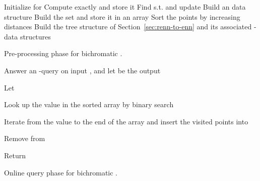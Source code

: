 \begin{algorithm}[!htb]
\LinesNumbered


  \BlankLine

  Initialize  for \;
  \ForEach{} {
    Compute  exactly and store it\;
    Find  s.t.  and
    update \;
  }
  \ForEach{} {
    Build an  data structure\;
  }
  \ForEach{} {
    Build the set  and store it 
    in an array  \;
    Sort the points  by increasing distances \;
  }
  Build the tree structure  of
  Section~\ref{sec:renn-to-enn} and its associated -\pleb data
  structures  \;
\caption{\small Pre-processing phase for bichromatic \rnn.}
  \label{alg:rnnpre_bichro}
\end{algorithm}
\begin{algorithm}[!htb]
\LinesNumbered


  \BlankLine

Answer an -\nn query on input , and let   be the output \;
  \For{ } { 
  }

  Let \; 

  Look up the value  in the sorted array  by binary search \;

  Iterate from the value  to the end of the array  and insert the visited points into  \;


  \ForEach{ } {
    \If{} {
        Remove  from \;
    }
  } 

  Return  \;
\caption{\small Online query phase for bichromatic \rnn.}
  \label{alg:rnnquery_bichro}
\end{algorithm}


